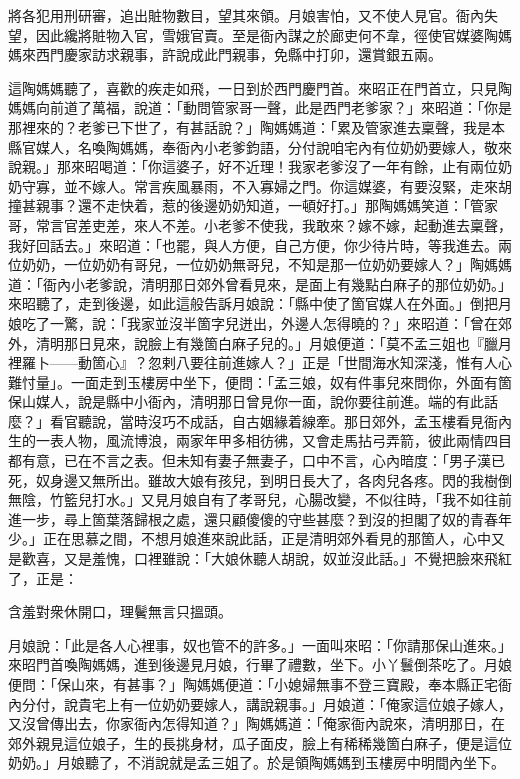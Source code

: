 將各犯用刑研審，追出賍物數目，望其來領。{}月娘害怕，又不使人見官。衙內失望，因此纔將賍物入官，雪娥官賣。至是衙內謀之於廊吏何不韋，徑使官媒婆陶媽媽來西門慶家訪求親事，許說成此門親事，免縣中打卯，還賞銀五兩。

這陶媽媽聽了，喜歡的疾走如飛，一日到於西門慶門首。來昭正在門首立，只見陶媽媽向前道了萬福，說道：「動問管家哥一聲，此是西門老爹家？」來昭道：「你是那裡來的？老爹已下世了，有甚話說？」陶媽媽道：「累及管家進去稟聲，我是本縣官媒人，名喚陶媽媽，奉衙內小老爹鈞語，分付說咱宅內有位奶奶要嫁人，敬來說親。」那來昭喝道：「你這婆子，好不近理！我家老爹沒了一年有餘，止有兩位奶奶守寡，並不嫁人。常言疾風暴雨，不入寡婦之門。你這媒婆，有要沒緊，走來胡撞甚親事？還不走快着，惹的後邊奶奶知道，一頓好打。」那陶媽媽笑道：「管家哥，常言官差吏差，來人不差。小老爹不使我，我敢來？嫁不嫁，起動進去稟聲，我好回話去。」來昭道：「也罷，與人方便，自己方便，你少待片時，等我進去。兩位奶奶，一位奶奶有哥兒，一位奶奶無哥兒，不知是那一位奶奶要嫁人？」陶媽媽道：「衙內小老爹說，清明那日郊外曾看見來，是面上有幾點白麻子的那位奶奶。」來昭聽了，走到後邊，如此這般告訴月娘說：「縣中使了箇官媒人在外面。」倒把月娘吃了一驚，說：「我家並沒半箇字兒迸出，外邊人怎得曉的？」來昭道：「曾在郊外，清明那日見來，說臉上有幾箇白麻子兒的。」月娘便道：「莫不孟三姐也『臘月裡羅卜——動箇心』？忽剌八要往前進嫁人？」正是「世間海水知深淺，惟有人心難忖量」。一面走到玉樓房中坐下，便問：「孟三娘，奴有件事兒來問你，外面有箇保山媒人，說是縣中小衙內，清明那日曾見你一面，說你要往前進。端的有此話麼？」{}看官聽說，當時沒巧不成話，自古姻緣着線牽。那日郊外，孟玉樓看見衙內生的一表人物，風流博浪，兩家年甲多相彷彿，又會走馬拈弓弄箭，彼此兩情四目都有意，已在不言之表。但未知有妻子無妻子，口中不言，心內暗度：「男子漢已死，奴身邊又無所出。雖故大娘有孩兒，到明日長大了，各肉兒各疼。閃的我樹倒無陰，竹籃兒打水。」又見月娘自有了孝哥兒，心腸改變，不似往時，「我不如往前進一步，尋上箇葉落歸根之處，還只顧傻傻的守些甚麼？到沒的担閣了奴的青春年少。」正在思慕之間，不想月娘進來說此話，正是清明郊外看見的那箇人，心中又是歡喜，又是羞愧，口裡雖說：「大娘休聽人胡說，奴並沒此話。」不覺把臉來飛紅了，{}正是：

\begin{myquote}
含羞對衆休開口，理鬢無言只搵頭。
\end{myquote}

月娘說：「此是各人心裡事，奴也管不的許多。」一面叫來昭：「你請那保山進來。」來昭門首喚陶媽媽，進到後邊見月娘，行畢了禮數，坐下。小丫鬟倒茶吃了。月娘便問：「保山來，有甚事？」陶媽媽便道：「小媳婦無事不登三寶殿，奉本縣正宅衙內分付，說貴宅上有一位奶奶要嫁人，講說親事。」月娘道：「俺家這位娘子嫁人，又沒曾傳出去，你家衙內怎得知道？」陶媽媽道：「俺家衙內說來，清明那日，在郊外親見這位娘子，生的長挑身材，瓜子面皮，臉上有稀稀幾箇白麻子，便是這位奶奶。」月娘聽了，不消說就是孟三姐了。於是領陶媽媽到玉樓房中明間內坐下。

